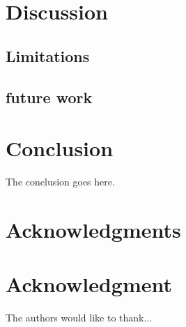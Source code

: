 \documentclass[10pt,journal,compsoc]{IEEEtran}
\theoremstyle{definition}
\theoremstyle{remark}
\begin{document}
\section{Discussion}
\subsection{Limitations}
\subsection{future work}

\section{Conclusion}
The conclusion goes here.


\appendices



\ifCLASSOPTIONcompsoc
  \section*{Acknowledgments}
\else
  \section*{Acknowledgment}
\fi


The authors would like to thank...


\ifCLASSOPTIONcaptionsoff
  \newpage
\fi





\end{document}
